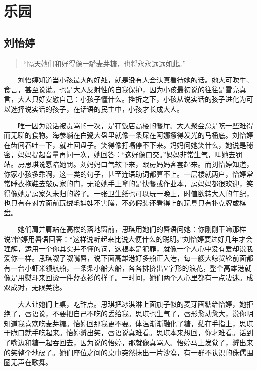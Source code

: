 \documentclass[12pt,UTF8]{ctexbook}
\begin{document}
\hypertarget{leyuan}{%
\chapter{乐园}\label{leyuan}}

\hypertarget{ux5218ux6021ux5a77}{%
\section*{刘怡婷}\label{ux5218ux6021ux5a77}}

\begin{quote}
\enquote{隔天她们和好得像一罐麦芽糖，也将永永远远如此。}
\end{quote}

　　刘怡婷知道当小孩最大的好处，就是没有人会认真看待她的话。她大可吹牛、食言，甚至说谎。也是大人反射性的自我保护，因为小孩最初说的往往是雪亮真言，大人只好安慰自己：小孩子懂什么。挫折之下，小孩从说实话的孩子进化为可以选择说实话的孩子，在话语的民主中，小孩才长成大人。

　　唯一因为说话被责骂的一次，是在饭店高楼的餐厅。大人聚会总是吃一些难得而无聊的食物。海参躺在白瓷大盘里就像一条屎在阿娜擦得发光的马桶底。刘怡婷在齿间吞吐一下，就吐回盘子。笑得像打嗝停不下来。妈妈问她笑什么，她说是秘密，妈妈提起音量再问一次，她回答：\enquote{这好像口交。}妈妈非常生气，叫她去罚站。房思琪说愿陪她罚。刘妈妈口气软下来，跟房妈妈客套起来。而刘怡婷知道，你家小孩多乖啊，这一类的句子，甚至连语助词都算不上。一层楼就两户，怡婷常常睡衣拖鞋去敲房家的门，无论她手上拿的是快餐或作业本，房妈妈都很欢迎，笑得像她是房家久未归的游子。一张卫生纸也可以玩一晚上，时值欲转大人的年纪，也只有在对方面前玩绒毛娃娃不害臊，不必假装还看得上的玩具只有扑克牌或棋盘。

　　她们肩并肩站在高楼的落地窗前，思琪用她们的唇语问她：你刚刚干嘛那样说?怡婷用唇语回答：\enquote{这样说听起来比说大便什么的聪明。}刘怡婷要过好几年才会理解，运用一个你其实并不懂的词，这根本是犯罪，就像一个人心中没有爱却说我爱你一样。思琪呶了呶嘴唇，说下面高雄港好多船正入港，每一艘大鲸货轮前面都有一台小虾米领航船，一条条小船大船，各各排挤出V字形的浪花，整个高雄港就像是用熨斗来回烫一件蓝衣衫的样子。一时间，她们两个人心里都有一点凄迷。成双成对，无限美德。

　　大人让她们上桌，吃甜点。思琪把冰淇淋上面旗子似的麦芽画糖给怡婷，她拒绝了，唇语说，不要把自己不吃的丢给我。思琪也生气了，唇形愈动愈大，说你明知道我喜欢吃麦芽糖。怡婷回那我更不要。体温渐渐融化了糖，黏在手指上，思琪干脆口就手吃起来。怡婷孵出笑，唇语说真难看。思琪本来想回，你才难看。话到了嘴边和糖一起吞回去，因为说的怡婷，那就像真骂人。怡婷马上发觉了，孵出来的笑整个地破了。她们座位之间的桌巾突然抹出一片沙漠，有一群不认识的侏儒围圈无声在歌舞。
\end{document}
